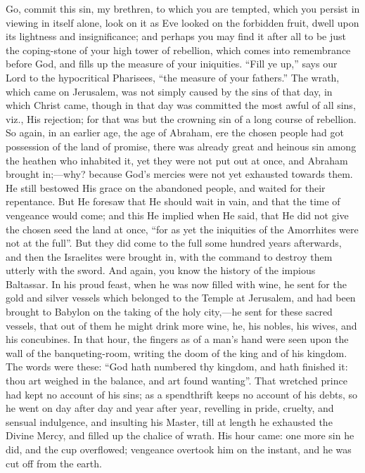 Go, commit this sin, my brethren, to which you are tempted, which
you persist in viewing in itself alone, look on it as Eve looked on
the forbidden fruit, dwell upon its lightness and insignificance; and
perhaps you may find it after all to be just the coping-stone of your
high tower of rebellion, which comes into remembrance before God, and
fills up the measure of your iniquities. ``Fill ye up,'' says
our Lord to the hypocritical Pharisees, ``the measure of your
fathers.'' The wrath, which came on Jerusalem, was not simply
caused by the sins of that day, in which Christ came, though in that
day was committed the most awful of all sins, viz., His rejection; for
that was but the crowning sin of a long course of rebellion. So again,
in an earlier age, the age of Abraham, ere the chosen people had got
possession of the land of promise, there was already great and heinous
sin among the heathen who inhabited it, yet they were not put out at
once, and Abraham brought in;—why? because God's mercies were not
yet exhausted towards them. He still bestowed His grace on the
abandoned people, and waited for their repentance. But He foresaw that
He should wait in vain, and that the time of vengeance would come; and
this He implied when He said, that He did not give the chosen seed the
land at once, ``for as yet the iniquities of the Amorrhites were
not at the full''. But they did come to the full some hundred
years afterwards, and then the Israelites were brought in, with the
command to destroy them utterly with the sword. And again, you know
the history of the impious Baltassar. In his proud feast, when he was
now filled with wine, he sent for the gold and silver vessels which
belonged to the Temple at Jerusalem, and had been brought to Babylon
on the taking of the holy city,—he sent for these sacred vessels,
that out of them he might drink more wine, he, his nobles, his wives,
and his concubines. In that hour, the fingers as of a man's hand were
seen upon the wall of the banqueting-room, writing the doom of the
king and of his kingdom. The words were these: ``God hath numbered
thy kingdom, and hath finished it: thou art weighed in the balance,
and art found wanting''. That wretched prince had kept no account
of his sins; as a spendthrift keeps no account of his debts, so he
went on day after day and year after year, revelling in pride,
cruelty, and sensual indulgence, and insulting his Master, till at
length he exhausted the Divine Mercy, and filled up the chalice of
wrath. His hour came: one more sin he did, and the cup overflowed;
vengeance overtook him on the instant, and he was cut off from the
earth.

